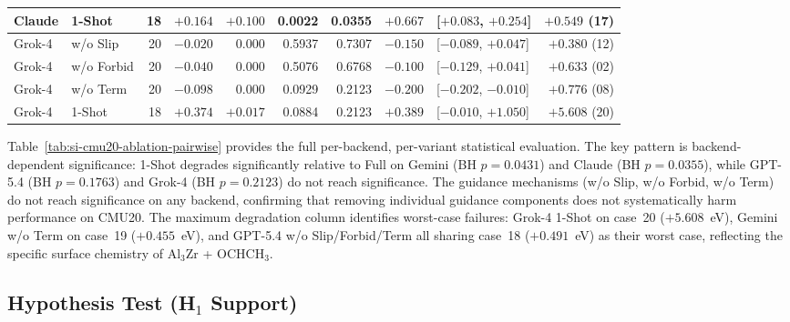 \documentclass[%
 preprint,
 superscriptaddress,
 amsmath,amssymb,
 aps,
 prb,
 floatfix,
]{revtex4-2}
\begin{document}
\begin{table}[ht]
{\begin{tabular}{llrrrrrllr}
Claude & 1-Shot & 18 & $+0.164$ & $+0.100$ & 0.0022 & 0.0355 & $+0.667$ & [$+0.083$, $+0.254$] & $+0.549$ (17) \\
\midrule
Grok-4 & w/o Slip & 20 & $-0.020$ & 0.000 & 0.5937 & 0.7307 & $-0.150$ & [$-0.089$, $+0.047$] & $+0.380$ (12) \\
Grok-4 & w/o Forbid & 20 & $-0.040$ & 0.000 & 0.5076 & 0.6768 & $-0.100$ & [$-0.129$, $+0.041$] & $+0.633$ (02) \\
Grok-4 & w/o Term & 20 & $-0.098$ & 0.000 & 0.0929 & 0.2123 & $-0.200$ & [$-0.202$, $-0.010$] & $+0.776$ (08) \\
Grok-4 & 1-Shot & 18 & $+0.374$ & $+0.017$ & 0.0884 & 0.2123 & $+0.389$ & [$-0.010$, $+1.050$] & $+5.608$ (20) \\
\bottomrule
\end{tabular}%
}
\end{table}

Table~\ref{tab:si-cmu20-ablation-pairwise} provides the full per-backend, per-variant statistical evaluation. The key pattern is backend-dependent significance: 1-Shot degrades significantly relative to Full on Gemini (BH $p = 0.0431$) and Claude (BH $p = 0.0355$), while GPT-5.4 (BH $p = 0.1763$) and Grok-4 (BH $p = 0.2123$) do not reach significance. The guidance mechanisms (w/o Slip, w/o Forbid, w/o Term) do not reach significance on any backend, confirming that removing individual guidance components does not systematically harm performance on CMU20. The maximum degradation column identifies worst-case failures: Grok-4 1-Shot on case~20 ($+5.608$~eV), Gemini w/o Term on case~19 ($+0.455$~eV), and GPT-5.4 w/o Slip/Forbid/Term all sharing case~18 ($+0.491$~eV) as their worst case, reflecting the specific surface chemistry of Al$_3$Zr + OCHCH$_3$.

\subsection{Hypothesis Test (H$_1$ Support)}
\end{document}
